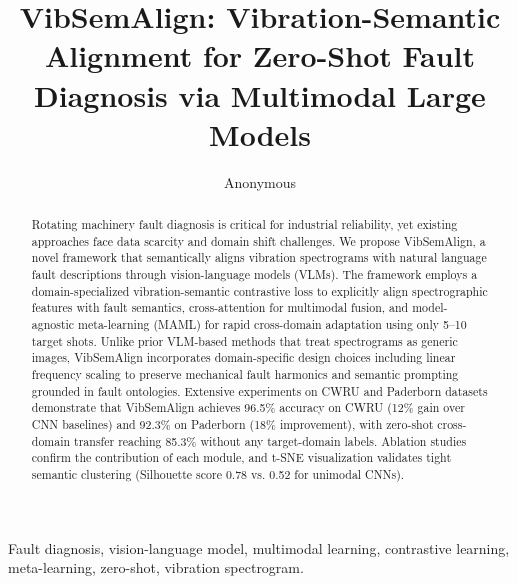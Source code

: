 \documentclass[lettersize,journal]{IEEEtran}
\begin{document}
\title{VibSemAlign: Vibration-Semantic Alignment for Zero-Shot Fault Diagnosis via Multimodal Large Models}

\author{Anonymous}

\maketitle

\begin{abstract}
Rotating machinery fault diagnosis is critical for industrial reliability, yet existing approaches face data scarcity and domain shift challenges. We propose VibSemAlign, a novel framework that semantically aligns vibration spectrograms with natural language fault descriptions through vision-language models (VLMs). The framework employs a domain-specialized vibration-semantic contrastive loss to explicitly align spectrographic features with fault semantics, cross-attention for multimodal fusion, and model-agnostic meta-learning (MAML) for rapid cross-domain adaptation using only 5--10 target shots. Unlike prior VLM-based methods that treat spectrograms as generic images, VibSemAlign incorporates domain-specific design choices including linear frequency scaling to preserve mechanical fault harmonics and semantic prompting grounded in fault ontologies. Extensive experiments on CWRU and Paderborn datasets demonstrate that VibSemAlign achieves 96.5\% accuracy on CWRU (12\% gain over CNN baselines) and 92.3\% on Paderborn (18\% improvement), with zero-shot cross-domain transfer reaching 85.3\% without any target-domain labels. Ablation studies confirm the contribution of each module, and t-SNE visualization validates tight semantic clustering (Silhouette score 0.78 vs. 0.52 for unimodal CNNs).
\end{abstract}

\begin{IEEEkeywords}
Fault diagnosis, vision-language model, multimodal learning, contrastive learning, meta-learning, zero-shot, vibration spectrogram.
\end{IEEEkeywords}









\end{document}
